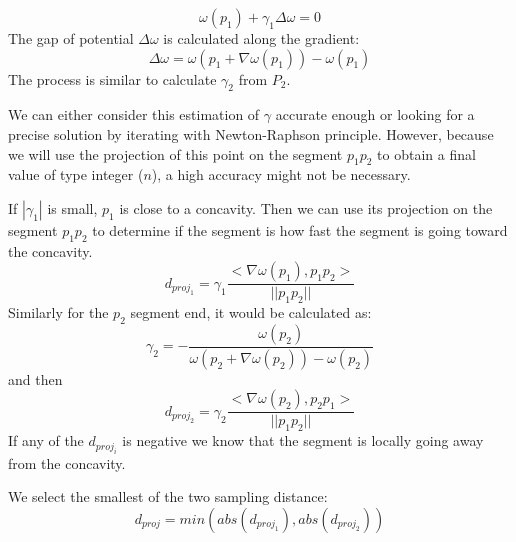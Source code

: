 \documentclass[11pt,a4paper]{article}
\begin{document}

\begin{equation}
\omega (p_1) + \gamma_1 \Delta \omega = 0
\end{equation}
The gap of potential $\Delta \omega$ is calculated along the gradient:
\begin{equation}
\Delta \omega  = \omega (p_1 + \nabla \omega (p_1)) - \omega (p_1)
\end{equation}
The process is similar to calculate $\gamma_2$ from $P_2$.

We can either consider this estimation of $\gamma$ accurate enough or looking for a precise solution by iterating with Newton-Raphson principle. However, because we will use the projection of this point on the segment $p_1p_2$ to obtain a final value of type integer ($n$), a high accuracy might not be necessary.


If $|\gamma_1|$ is small, $p_1$ is close to a concavity. 
Then we can use its projection on the segment $p_1p_2$ to determine if the segment is how fast the segment is going toward the concavity.
\begin{equation}
 d_{proj_1} = \gamma_1 \frac{<\nabla \omega(p_1), p_1p_2>}{||p_1p_2||} 
\end{equation}
Similarly for the $p_2$ segment end, it would be calculated  as:
\begin{equation}
\gamma_2 = - \frac{\omega(p_2)}{\omega( p_2 + \nabla \omega(p_2)) -\omega(p_2)} 
\end{equation}
and then
\begin{equation}
 d_{proj_2} = \gamma_2 \frac{<\nabla \omega(p_2), p_2p_1>}{||p_1p_2||}
\end{equation}
If any of the $d_{proj_i}$ is negative we know that the segment is locally going away from the concavity.

We select the smallest of the two sampling distance:
\begin{equation}
d_{proj} = min(abs(d_{proj_1}), abs(d_{proj_2}))
\end{equation}
\end{document}
